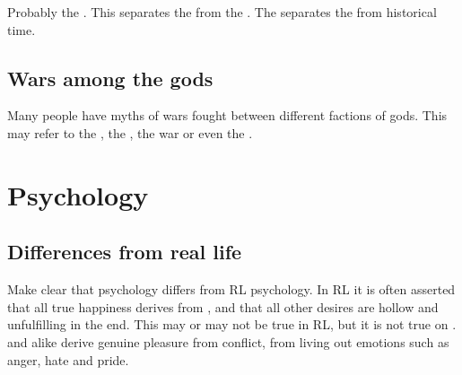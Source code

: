 Probably the \secondbanewar. This separates the  from the . The \CuezcanApocalypse{} separates the  from historical time. 










\subsection{Wars among the gods}
Many people have myths of wars fought between different factions of gods. This may refer to the \banewars, the \resphanwars{}, the \Merkyran{} war or even the . 















\section{Psychology}









\subsection{Differences from real life}
Make clear that \Miithian psychology differs from RL psychology.
In RL it is often asserted that all true happiness derives from , and that all other desires are hollow and unfulfilling in the end.
This may or may not be true in RL, but it is not true on \Miith.
\Resphain and \dragons alike derive genuine pleasure from conflict, from living out  emotions such as anger, hate and pride.

